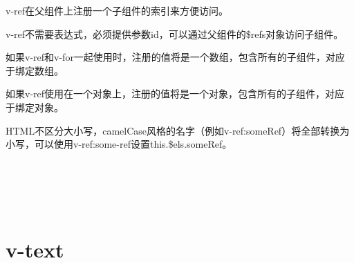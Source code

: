 v-ref在父组件上注册一个子组件的索引来方便访问。

v-ref不需要表达式，必须提供参数id，可以通过父组件的\$refs对象访问子组件。

\begin{compactitem}
\item 如果v-ref和v-for一起使用时，注册的值将是一个数组，包含所有的子组件，对应于绑定数组。
\item 如果v-ref使用在一个对象上，注册的值将是一个对象，包含所有的子组件，对应于绑定对象。
\end{compactitem}

HTML不区分大小写，camelCase风格的名字（例如v-ref:someRef）将全部转换为小写，可以使用v-ref:some-ref设置this.\$els.someRef。










\begin{lstlisting}[language=JavaScript]

\end{lstlisting}




\begin{lstlisting}[language=JavaScript]

\end{lstlisting}




\begin{lstlisting}[language=JavaScript]

\end{lstlisting}




\begin{lstlisting}[language=JavaScript]

\end{lstlisting}




\begin{lstlisting}[language=JavaScript]

\end{lstlisting}




\begin{lstlisting}[language=JavaScript]

\end{lstlisting}

\chapter{v-text}


